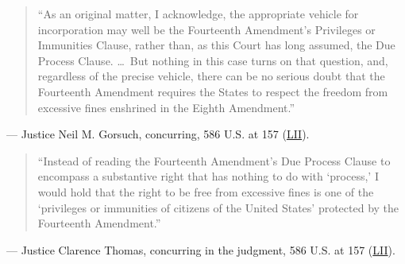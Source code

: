 \documentclass[12pt]{article}
\begin{document}
\begin{quote}
``As an original matter, I acknowledge, the appropriate vehicle for incorporation may well be the Fourteenth Amendment's Privileges or Immunities Clause, rather than, as this Court has long assumed, the Due Process Clause. \ldots\ But nothing in this case turns on that question, and, regardless of the precise vehicle, there can be no serious doubt that the Fourteenth Amendment requires the States to respect the freedom from excessive fines enshrined in the Eighth Amendment.''
\end{quote}
\noindent --- Justice Neil M. Gorsuch, concurring, 586 U.S. at 157 (\href{https://www.law.cornell.edu/supremecourt/text/17-1091}{LII}).

\begin{quote}
``Instead of reading the Fourteenth Amendment's Due Process Clause to encompass a substantive right that has nothing to do with `process,' I would hold that the right to be free from excessive fines is one of the `privileges or immunities of citizens of the United States' protected by the Fourteenth Amendment.''
\end{quote}
\noindent --- Justice Clarence Thomas, concurring in the judgment, 586 U.S. at 157 (\href{https://www.law.cornell.edu/supremecourt/text/17-1091}{LII}).
\end{document}
